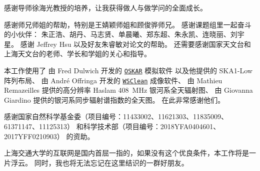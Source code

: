 
\begin{thanks}

感谢导师徐海光教授的培养，让我获得做人与做学问的全面成长。

感谢师兄师姐的帮助，特别是王婧颖师姐和顾俊骅师兄。
感谢课题组里一起奋斗的小伙伴：
朱正浩、胡丹、马志贤、单晨曦、郑东超、朱永凯、连晓丽、刘宇星。
感谢 Jeffrey Hsu 以及好友朱睿敏对论文的帮助。
还需要感谢国家天文台和上海天文台的老师、学长和学姐的关心和指导。

本工作使用了
由 Fred Dulwich 开发的
\href{https://github.com/OxfordSKA/OSKAR}{\texttt{OSKAR}} 模拟软件
以及他提供的 SKA1-Low 阵列布局、
由 André Offringa 开发的
\href{https://sourceforge.net/projects/wsclean/}{\texttt{WSClean}} 成像软件、
由 Mathieu Remazeilles 提供的高分辨率 Haslam \SI{408}{\MHz} 银河系全天辐射图、
由 Giovanna Giardino 提供的银河系同步辐射谱指数的全天图。
在此非常感谢他们。

感谢国家自然科学基金委（项目编号：11433002、11621303、11835009、61371147、11125313）
和科学技术部（项目编号：2018YFA0404601、2017YFF0210903）
的资助。

上海交通大学的互联网是国内首屈一指的，如果没有这个优良条件，本工作将是一片浮云。
同时，我也将无法忘记在这里结识的一群好朋友。


\end{thanks}
